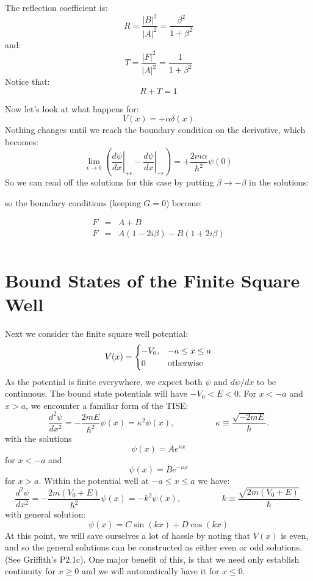 \documentclass[12pt]{book}
\begin{document}
The reflection coefficient is:
$$R = \frac{|B|^2}{|A|^2} = \frac{\beta^2}{1+\beta^2}$$
and:
$$T = \frac{|F|^2}{|A|^2} = \frac{1}{1+\beta^2}$$
Notice that:
$$R+T=1$$

Now let's look at what happens for:
$$V(x) = +\alpha \delta(x)$$
Nothing changes until we reach the boundary condition on the derivative, which becomes:
$$
\lim_{\epsilon \to 0} \left( \left. \frac{d\psi}{d x} \right\rvert_{+\epsilon} 
- \left. \frac{d\psi}{d x} \right\rvert_{-\epsilon} \right) = 
+\frac{2m\alpha}{\hbar^2} \psi(0) 
$$
So we can read off the solutions for this case by putting $\beta \to -\beta$ in the solutions:


so the boundary conditions (keeping $G=0$) become:

\begin{eqnarray*}
F &=& A+B \\
F &=& A (1-2i\beta) - B (1+2i\beta)\\
\end{eqnarray*}

\section{Bound States of the Finite Square Well}

Next we consider the finite square well potential:
$$V(x) = \begin{cases}
-V_0, & -a \leq x \leq a \\
0     & {\rm otherwise} \\
\end{cases}
$$
As the potential is finite everywhere, we expect both $\psi$ and $d\psi/dx$ to be continuous.
The bound state potentials will have $-V_0 < E < 0$.  For $x < -a$ and $x > a$, we encounter a familiar form of the TISE:
\begin{equation*}
\frac{d^2 \psi}{d x^2} = -\frac{2mE}{\hbar^2}\psi(x) = \kappa^2 \psi(x), \hspace{2cm} \kappa \equiv \frac{\sqrt{-2mE}}{\hbar}.
\end{equation*}
with the solutions
$$\psi(x) = A e^{\displaystyle \kappa x}$$
for $x<-a$ and
$$\psi(x) = B e^{\displaystyle -\kappa x}$$
for $x>a$.  Within the potential well at $-a \leq x \leq a$ we have:
\begin{equation*}
\frac{d^2 \psi}{d x^2} = -\frac{2m(V_0+E)}{\hbar^2}\psi(x) = -k^2 \psi(x), \hspace{2cm} k \equiv \frac{\sqrt{2m(V_0 + E)}}{\hbar}.
\end{equation*}
with general solution:
$$\psi(x) = C \sin(kx) + D \cos(kx)$$
At this point, we will save ourselves a lot of hassle by noting that $V(x)$ is even, and so the general solutions can be constructed as either even or odd solutions. (See Griffith's P2.1c).
One major benefit of this, is that we need only establish continuity for $x \geq 0$ and we will automatically have it for $x \leq 0$.
\end{document}
